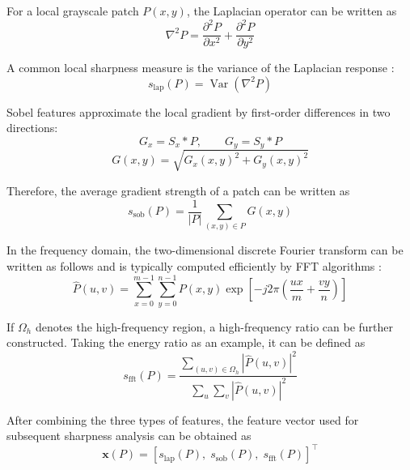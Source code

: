 \par For a local grayscale patch $P(x,y)$, the Laplacian operator can be written
as
\begin{equation}
    \nabla^2 P=\frac{\partial^2 P}{\partial x^2}+\frac{\partial^2 P}{\partial y^2}
    \label{eq:laplacian-basic}
\end{equation}
\par A common local sharpness measure is the variance of the Laplacian response
\cite{pertuz2013analysis}:
\begin{equation}
    s_{\mathrm{lap}}(P)=\operatorname{Var}\!\left(\nabla^2 P\right)
    \label{eq:laplacian-var-basic}
\end{equation}
\par Sobel features approximate the local gradient by first-order differences in
two directions:
\begin{equation}
    G_x=S_x*P,\qquad G_y=S_y*P
    \label{eq:sobel-basic}
\end{equation}
\begin{equation}
    G(x,y)=\sqrt{G_x(x,y)^2+G_y(x,y)^2}
    \label{eq:sobel-magnitude-basic}
\end{equation}
\par Therefore, the average gradient strength of a patch can be written as
\begin{equation}
    s_{\mathrm{sob}}(P)=\frac{1}{|P|}\sum_{(x,y)\in P} G(x,y)
    \label{eq:sobel-score-basic}
\end{equation}
\par In the frequency domain, the two-dimensional discrete Fourier transform can
be written as follows and is typically computed efficiently by FFT algorithms
\cite{cooley1965algorithm}:
\begin{equation}
    \hat{P}(u,v)=\sum_{x=0}^{m-1}\sum_{y=0}^{n-1}
    P(x,y)\exp\!\left[-j2\pi\left(\frac{ux}{m}+\frac{vy}{n}\right)\right]
    \label{eq:dft-basic}
\end{equation}
\par If $\Omega_h$ denotes the high-frequency region, a high-frequency ratio can
be further constructed. Taking the energy ratio as an example, it can be defined
as
\begin{equation}
    s_{\mathrm{fft}}(P)=
    \frac{\sum_{(u,v)\in\Omega_h}\left|\hat{P}(u,v)\right|^2}
    {\sum_{u}\sum_{v}\left|\hat{P}(u,v)\right|^2}
    \label{eq:fft-energy-basic}
\end{equation}
\par After combining the three types of features, the feature vector used for
subsequent sharpness analysis can be obtained as
\begin{equation}
    \mathbf{x}(P)=
    \left[s_{\mathrm{lap}}(P),\; s_{\mathrm{sob}}(P),\; s_{\mathrm{fft}}(P)\right]^\top
    \label{eq:feature-vector-basic}
\end{equation}

